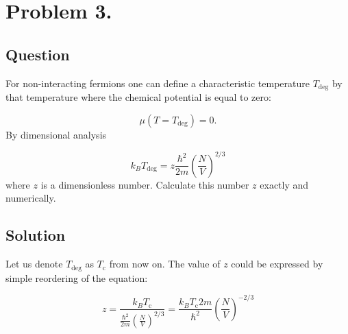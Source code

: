 \section*{Problem 3.}
\subsection*{Question}
For non-interacting fermions one can define a characteristic temperature $T_{\text{deg}}$ by that temperature where the chemical potential is equal to zero:

\begin{equation*}
\mu \left( T = T_{\text{deg}} \right) = 0.
\end{equation*}
By dimensional analysis

\begin{equation*}
k_{B} T_{\text{deg}}
=
z \frac{\hbar^{2}}{2m} \left( \frac{N}{V} \right)^{2/3}
\end{equation*}
where $z$ is a dimensionless number. Calculate this number $z$ exactly and numerically.

\subsection*{Solution}
Let us denote $T_{\text{deg}}$ as $T_{\text{c}}$ from now on. The value of $z$ could be expressed by simple reordering of the equation:

\begin{equation}
z
=
\frac{k_{B} T_{\text{c}}}{\frac{\hbar^{2}}{2m} \left( \frac{N}{V} \right)^{2/3}}
=
\frac{k_{B} T_{\text{c}} 2m}{\hbar^{2}}
\left( \frac{N}{V} \right)^{-2/3}
\end{equation}